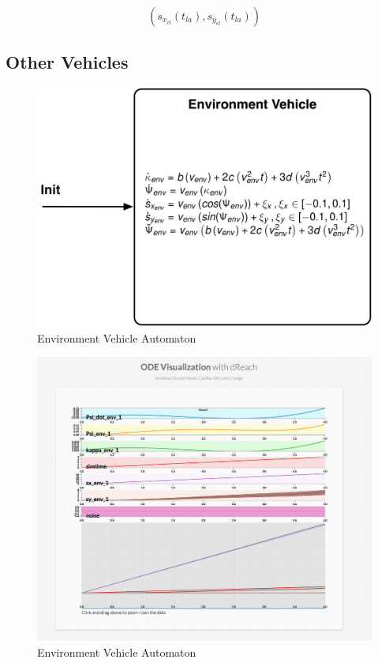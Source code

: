 \documentclass{easychair}
\theoremstyle{theorem}
\theoremstyle{remark}
\begin{document}
\begin{equation}
	\left(s_{x_{cl}}(t_{la}), s_{y_{cl}}(t_{la})\right)
\end{equation} 

\subsection{Other Vehicles}
	\begin{figure}[h]
		\centering
		\includegraphics[scale=0.35]{figures/environment}
		\caption{Environment Vehicle Automaton}
	\end{figure}
		\begin{figure}[h]
			\centering
			\includegraphics[width=\textwidth]{figures/dreachenv}
			\caption{Environment Vehicle Automaton}
		\end{figure}
\end{document}
